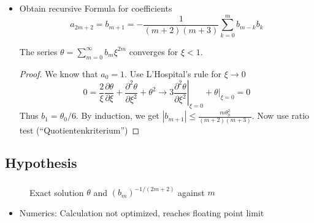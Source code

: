\begin{frame}
	\begin{itemize}[<+->]
		\item Obtain recursive Formula for coefficients
		\begin{equation}
			a_{2m+2}=b_{m+1}= -\frac{1}{(m+2)(m+3)}\sum\limits_{k=0}^mb_{m-k}b_k
		\end{equation}
		\begin{theorem}
			The series $\theta=\sum\limits_{m=0}^\infty b_{m}\xi^{2m}$ converges for $\xi<1$. %
		\end{theorem}
		\begin{proof}
			We know that $a_0=1$. Use L'Hospital's rule for $\xi\rightarrow0$
			\begin{equation}
				0=\frac{2}{\xi}\frac{\partial\theta}{\partial\xi} + \frac{\partial^2\theta}{\partial\xi^2}+\theta^2\longrightarrow3\left.\frac{\partial^2\theta}{\partial\xi^2}\right|_{\xi=0}+\left.\theta\right|_{\xi=0}=0
			\end{equation}
			Thus $b_1=\theta_0/6$. By induction, we get $|b_{m+1}|\leq\frac{m\theta_0^2}{(m+2)(m+3)}$. Now use ratio test (``Quotientenkriterium'')
		\end{proof}
	\end{itemize}
\end{frame}

\subsection{Hypothesis}
\begin{frame}
	\frametitle{\insertsubsection}
	\begin{figure}
		\caption{Exact solution $\theta$ and $(b_m)^{-1/(2m+2)}$ against $m$}
	\end{figure}
	\begin{itemize}[<+->]
		\begin{hypothesis}
			The radius of convergence $R$ of the above calculated series is exactly the value at which $\theta(R)=0$.
		\end{hypothesis}
		\item Numerics: Calculation not optimized, reaches floating point limit
	\end{itemize}
\end{frame}


